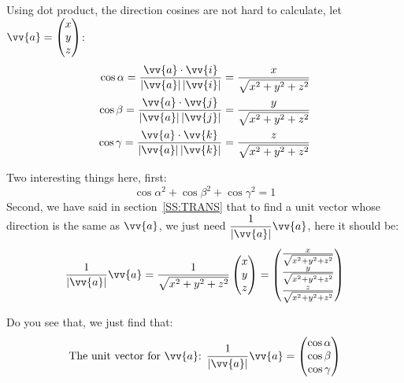 \documentclass[12pt, a4paper, reqno]{amsart}
\theoremstyle{definition}
\numberwithin{equation}{section} %
\begin{document}
Using dot product, the direction cosines are not hard to calculate, let $\vv{a}=\begin{pmatrix}
	x\\
	y\\
	z
\end{pmatrix}$:
\begin{align}\label{E:DC}
	\cos \alpha = \frac{\vv{a}\cdot \vv{i}}{\left|\vv{a}\right|\left|\vv{i}\right|}
	=\frac{x}
	{\sqrt{x^2 + y^2 + z^2}}\\
	\cos \beta = \frac{\vv{a}\cdot \vv{j}}{\left|\vv{a}\right|\left|\vv{j}\right|}
	=\frac{y}
	{\sqrt{x^2 + y^2 + z^2}}\\
	\cos \gamma = \frac{\vv{a}\cdot \vv{k}}{\left|\vv{a}\right|\left|\vv{k}\right|}
	=\frac{z}
	{\sqrt{x^2 + y^2 + z^2}}
\end{align}

Two interesting things here, first:
\begin{equation}\label{E:CCC1}
	{\cos \alpha}^2 + {\cos \beta}^2 + {\cos \gamma}^2 = 1
\end{equation}
Second, we have said in section~\ref{SS:TRANS} that to find a unit vector whose direction is the same as $\vv{a}$, we just need $\displaystyle \frac{1}{\left|\vv{a}\right|}\vv{a}$, here it should be:
\begin{equation*}
	\frac{1}{\left|\vv{a}\right|}\vv{a} = \frac{1}{\sqrt{x^2 + y^2 + z^2}}\begin{pmatrix}
		x\\
		y\\
		z
	\end{pmatrix}
	= \begin{pmatrix}
		\frac{x}
		{\sqrt{x^2 + y^2 + z^2}}\\
		\frac{y}
		{\sqrt{x^2 + y^2 + z^2}}\\
		\frac{z}
		{\sqrt{x^2 + y^2 + z^2}}
	\end{pmatrix}
\end{equation*}

Do you see that, we just find that:
\begin{equation}\label{E:UCCC}
	\text{The unit vector for $\vv{a}$: }\frac{1}{\left|\vv{a}\right|}\vv{a} = \begin{pmatrix}
		\cos \alpha\\
		\cos \beta\\
		\cos \gamma
	\end{pmatrix}
\end{equation}
\end{document}
